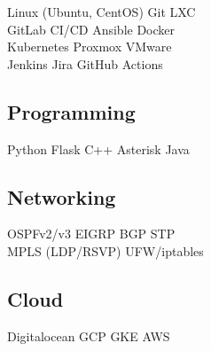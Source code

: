 \documentclass[letterpaper]{deedy-resume} %
\begin{document}
\begin{minipage}[t]{0.33\textwidth}
Linux (Ubuntu, CentOS) \textbullet{} Git \textbullet{}  LXC \\
GitLab CI/CD \textbullet{}  Ansible \textbullet{}  Docker \\ 
Kubernetes \textbullet{}  Proxmox \textbullet{}  VMware \\
Jenkins \textbullet{} Jira \textbullet{} GitHub Actions

\sectionspace %


\subsection{Programming}

Python \textbullet{} Flask \textbullet{} C++ \textbullet{} Asterisk \textbullet{}  Java \\ 
 
\sectionspace %

\subsection{Networking}

OSPFv2/v3 \textbullet{} EIGRP \textbullet{} BGP \textbullet{} STP \\ 
MPLS (LDP/RSVP) \textbullet{} UFW/iptables

\sectionspace %

\subsection{Cloud}

Digitalocean \textbullet{} GCP \textbullet{} GKE \textbullet{} AWS \\

\sectionspace %



\end{minipage} %
\hfill
%
%
\end{document}
